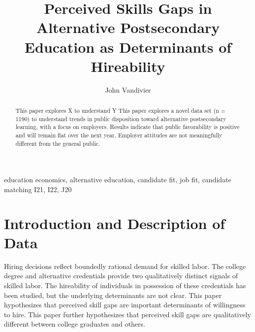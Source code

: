 \documentclass[review]{elsarticle}
\begin{document}
\begin{frontmatter}

    \title{
        Perceived Skills Gaps in Alternative Postsecondary Education as Determinants of Hireability
    }

    \author[mymainaddress]{John Vandivier}
    \address[mymainaddress]{4400 University Dr, Fairfax, VA 22030}

    \begin{abstract}
        This paper explores X to understand Y
        This paper explores a novel data set (n = 1190) to understand trends in public
        disposition toward alternative postsecondary learning, with a focus on employers.
        Results indicate that public favorability is positive and will remain flat over the next year.
        Employer attitudes are not meaningfully different from the general public.
    \end{abstract}

    \begin{keyword}
        education economics, alternative education, candidate fit, job fit, candidate matching     %
        \MSC[2010] I21, I22, J20                                                                   %
    \end{keyword}

\end{frontmatter}

\pagebreak
\linenumbers

\section{Introduction and Description of Data}

Hiring decisions reflect boundedly rational demand for skilled labor.
The college degree and alternative credentials provide two qualitatively distinct signals of skilled labor.
The hireability of individuals in possession of these credentials has been studied,
but the underlying determinants are not clear.
This paper hypothesizes that perceived skill gaps are important determinants of willingness to hire.
This paper further hypothesizes that perceived skill gaps are qualitatively different between college graduates and others.
\end{document}
